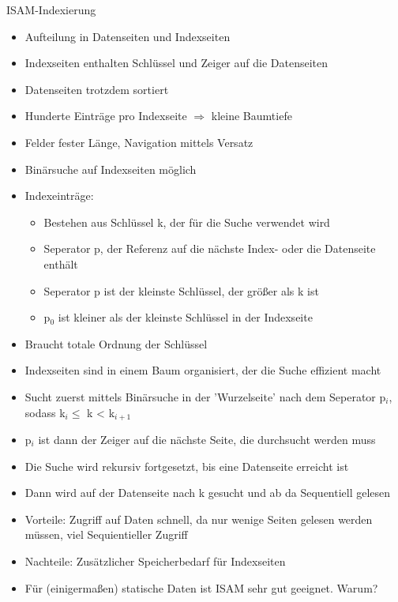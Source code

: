 \documentclass{article}
\begin{document}
\begin{block}{ISAM-Indexierung}
  \begin{itemize}
    \item Aufteilung in Datenseiten und Indexseiten
    \item Indexseiten enthalten Schlüssel und Zeiger auf die Datenseiten
    \item Datenseiten trotzdem sortiert
    \item Hunderte Einträge pro Indexseite $\Rightarrow$ kleine Baumtiefe
    \item Felder fester Länge, Navigation mittels Versatz
    \item Binärsuche auf Indexseiten möglich
    \item Indexeinträge:
    \begin{itemize}
      \item Bestehen aus Schlüssel k, der für die Suche verwendet wird
      \item Seperator p, der Referenz auf die nächste Index- oder die Datenseite enthält
      \item Seperator p ist der kleinste Schlüssel, der größer als k ist
      \item p$_0$ ist kleiner als der kleinste Schlüssel in der Indexseite
    \end{itemize}
    \item Braucht totale Ordnung der Schlüssel
    \item Indexseiten sind in einem Baum organisiert, der die Suche effizient macht
    \item Sucht zuerst mittels Binärsuche in der 'Wurzelseite' nach dem Seperator p$_i$, sodass k$_i \leq$ k < k$_{i+1}$
    \item p$_i$ ist dann der Zeiger auf die nächste Seite, die durchsucht werden muss
    \item Die Suche wird rekursiv fortgesetzt, bis eine Datenseite erreicht ist
    \item Dann wird auf der Datenseite nach k gesucht und ab da Sequentiell gelesen
    \item Vorteile: Zugriff auf Daten schnell, da nur wenige Seiten gelesen werden müssen, viel Sequientieller Zugriff
    \item Nachteile: Zusätzlicher Speicherbedarf für Indexseiten
    \item Für (einigermaßen) statische Daten ist ISAM sehr gut geeignet. Warum?
  \end{itemize}
\end{block}
\end{document}
